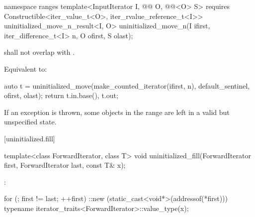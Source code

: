 \begin{addedblock}
%
\begin{itemdecl}
namespace ranges {
  template<InputIterator I, @@ O, @@<O> S>
      requires Constructible<iter_value_t<O>, iter_rvalue_reference_t<I>>
    uninitialized_move_n_result<I, O>
      uninitialized_move_n(I ifirst, iter_difference_t<I> n, O ofirst, S olast);
}
\end{itemdecl}

\begin{itemdescr}
\pnum
\expects
{} shall not overlap with
.

\pnum
\effects Equivalent to:
\begin{codeblock}
auto t = uninitialized_move(make_counted_iterator(ifirst, n),
                            default_sentinel{}, ofirst, olast);
return {t.in.base(), t.out};
\end{codeblock}

\pnum
\begin{note}
If an exception is thrown, some objects in the range
are left in a valid but unspecified state.
\end{note}
\end{itemdescr}
\end{addedblock}

[uninitialized.fill]{}

%
\begin{itemdecl}
template<class ForwardIterator, class T>
  void uninitialized_fill(ForwardIterator first, ForwardIterator last, const T& x);
\end{itemdecl}

\begin{itemdescr}
\pnum
\effects
{}:
\begin{codeblock}
for (; first != last; ++first)
  ::new (static_cast<void*>(addressof(*first)))
    typename iterator_traits<ForwardIterator>::value_type(x);
\end{codeblock}
\end{itemdescr}

